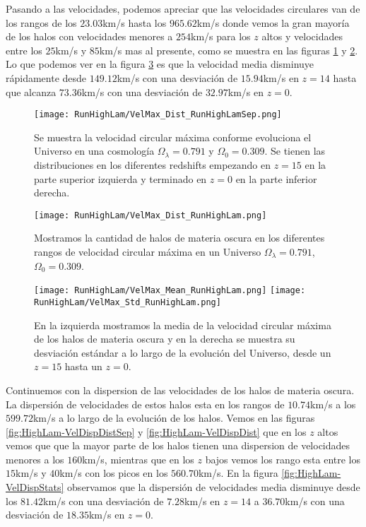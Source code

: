 Pasando a las velocidades, podemos apreciar que las velocidades circulares van de los rangos de los $23.03$km/s hasta los $965.62$km/s donde vemos la gran mayoría de los halos con velocidades menores a $254$km/s para los $z$ altos y  velocidades entre los $25$km/s y $85$km/s mas al presente, como se muestra en las figuras \ref{fig:HighLam-VelMaxDistSep} y \ref{fig:HighLam-VelMaxDist}. Lo que podemos ver en la figura \ref{fig:HighLam-VelMaxStats} es que la velocidad media disminuye rápidamente desde $149.12$km/s con una desviación de $15.94$km/s en $z=14$ hasta que alcanza $73.36$km/s con una desviación de $32.97$km/s en $z=0$.

\begin{figure}[H]
    \centering
    \texttt{[image: RunHighLam/VelMax\_Dist\_RunHighLamSep.png]}
    \caption[Velocidad circular máxima]{\footnotesize Se muestra la velocidad circular máxima conforme evoluciona el Universo en una cosmología $\Omega_\lambda = 0.791$ y $\Omega_0 = 0.309$. Se tienen las distribuciones en los diferentes redshifts empezando en $z=15$ en la parte superior izquierda y terminado en $z=0$ en la parte inferior derecha.}
    \label{fig:HighLam-VelMaxDistSep}
\end{figure}

\begin{figure}[H]
    \centering
    \texttt{[image: RunHighLam/VelMax\_Dist\_RunHighLam.png]}
    \caption[Distribución de la velocidad circular máxima]{\footnotesize Mostramos la cantidad de halos de materia oscura en los diferentes rangos de velocidad circular máxima en un Universo $\Omega_\lambda = 0.791$, $\Omega_0 = 0.309$.}
    \label{fig:HighLam-VelMaxDist}
\end{figure}

\begin{figure}[H]
    \centering
    \texttt{[image: RunHighLam/VelMax\_Mean\_RunHighLam.png]}
    \texttt{[image: RunHighLam/VelMax\_Std\_RunHighLam.png]}
    \caption[Media y desviación estándar de la velocidad circular máxima]{\footnotesize En la izquierda mostramos la media de la velocidad circular máxima de los halos de materia oscura y en la derecha se muestra su desviación estándar a lo largo de la evolución del Universo, desde un $z=15$ hasta un $z=0$.}
    \label{fig:HighLam-VelMaxStats}
\end{figure}

Continuemos con la dispersion de las velocidades de los halos de materia oscura. La dispersión de velocidades de estos halos esta en los rangos de $10.74$km/s a los $599.72$km/s a lo largo de la evolución de los halos. Vemos en las figuras \ref{fig:HighLam-VelDispDistSep} y \ref{fig:HighLam-VelDispDist} que en los $z$ altos vemos que que la mayor parte de los halos tienen una dispersion de velocidades menores a los $160$km/s, mientras que en los $z$ bajos vemos los rango esta entre los $15$km/s y $40$km/s con los picos en los $560.70$km/s. En la figura \ref{fig:HighLam-VelDispStats} observamos que la dispersión de velocidades media disminuye desde los $81.42$km/s con una desviación de $7.28$km/s en $z=14$ a $36.70$km/s con una desviación de $18.35$km/s en $z=0$.

